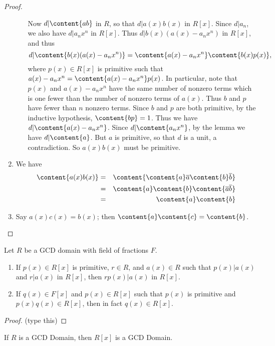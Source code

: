 \documentclass{article}
\begin{document}
\begin{proof}
\begin{enumerate}
\begin{enumerate}
Now $d|\content{ab}$ in $R$, so that $d|a(x)b(x)$ in $R[x]$. Since $d|a_n$, we also have $d|a_nx^n$ in $R[x]$. Thus $d|b(x)(a(x) - a_nx^n)$ in $R[x]$, and thus \[ d | \content{b(x)(a(x) - a_nx^n)} = \content{a(x) - a_nx^n}\content{b(x)p(x)}, \] where $p(x) \in R[x]$ is primitive such that $a(x) - a_nx^n = \content{a(x) - a_nx^n}p(x)$. In particular, note that $p(x)$ and $a(x) - a_nx^n$ have the same number of nonzero terms which is one fewer than the number of nonzero terms of $a(x)$. Thus $b$ and $p$ have fewer than $n$ nonzero terms. Since $b$ and $p$ are both primitive, by the inductive hypothesis, $\content{bp} = 1$. Thus we have $d|\content{a(x) - a_nx^n}$. Since $d|\content{a_nx^n}$, by the lemma we have $d|\content{a}$. But $a$ is primitive, so that $d$ is a unit, a contradiction. So $a(x)b(x)$ must be primitive.
\end{enumerate}

\item We have
\begin{eqnarray*}
\content{a(x)b(x)} & = & \content{\content{a}\overline{a}\content{b}\overline{b}} \\
 & = & \content{a}\content{b}\content{\overline{a}\overline{b}} \\
 & = & \content{a}\content{b}
\end{eqnarray*}

\item Say $a(x)c(x) = b(x)$; then $\content{a}\content{c} = \content{b}$. \qedhere
\end{enumerate}
\end{proof}

\begin{lem}
Let $R$ be a GCD domain with field of fractions $F$.
\begin{enumerate}
\item If $p(x) \in R[x]$ is primitive, $r \in R$, and $a(x) \in R$ such that $p(x)|a(x)$ and $r|a(x)$ in $R[x]$, then $rp(x)|a(x)$ in $R[x]$.
\item If $q(x) \in F[x]$ and $p(x) \in R[x]$ such that $p(x)$ is primitive and $p(x)q(x) \in R[x]$, then in fact $q(x) \in R[x]$.
\end{enumerate}
\end{lem}

\begin{proof}
(type this)
\end{proof}

\begin{prop}
If $R$ is a GCD Domain, then $R[x]$ is a GCD Domain.
\end{prop}
\end{document}
